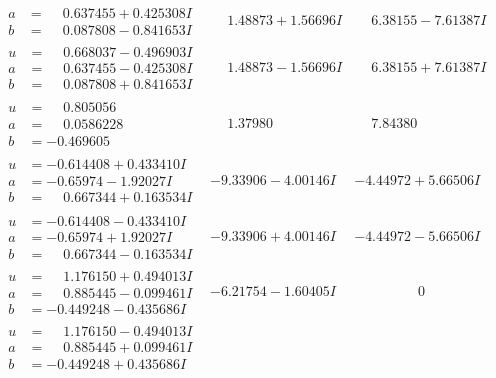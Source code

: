 \documentclass[1p]{elsarticle_modified}
\theoremstyle{definition}
\begin{document}
$$\begin{array}{c|c|c}
\begin{aligned}
a &= \phantom{-}0.637455 + 0.425308 I \\
b &= \phantom{-}0.087808 - 0.841653 I\end{aligned}
 & \phantom{-}1.48873 + 1.56696 I & \phantom{-}6.38155 - 7.61387 I \\ \hline\begin{aligned}
u &= \phantom{-}0.668037 - 0.496903 I \\
a &= \phantom{-}0.637455 - 0.425308 I \\
b &= \phantom{-}0.087808 + 0.841653 I\end{aligned}
 & \phantom{-}1.48873 - 1.56696 I & \phantom{-}6.38155 + 7.61387 I \\ \hline\begin{aligned}
u &= \phantom{-}0.805056\phantom{ +0.000000I} \\
a &= \phantom{-}0.0586228\phantom{ +0.000000I} \\
b &= -0.469605\phantom{ +0.000000I}\end{aligned}
 & \phantom{-}1.37980\phantom{ +0.000000I} & \phantom{-}7.84380\phantom{ +0.000000I} \\ \hline\begin{aligned}
u &= -0.614408 + 0.433410 I \\
a &= -0.65974 - 1.92027 I \\
b &= \phantom{-}0.667344 + 0.163534 I\end{aligned}
 & -9.33906 - 4.00146 I & -4.44972 + 5.66506 I \\ \hline\begin{aligned}
u &= -0.614408 - 0.433410 I \\
a &= -0.65974 + 1.92027 I \\
b &= \phantom{-}0.667344 - 0.163534 I\end{aligned}
 & -9.33906 + 4.00146 I & -4.44972 - 5.66506 I \\ \hline\begin{aligned}
u &= \phantom{-}1.176150 + 0.494013 I \\
a &= \phantom{-}0.885445 - 0.099461 I \\
b &= -0.449248 - 0.435686 I\end{aligned}
 & -6.21754 - 1.60405 I & \phantom{-0.000000 } 0 \\ \hline\begin{aligned}
u &= \phantom{-}1.176150 - 0.494013 I \\
a &= \phantom{-}0.885445 + 0.099461 I \\
b &= -0.449248 + 0.435686 I\end{aligned}

\end{array}$$
\end{document}
